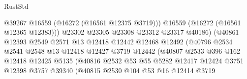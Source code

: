 \begin{lexlean}{RustStd}
\begin{coremodule}
                                          @39267
                                          @16559
                                          (@16272 (@16561 @12375 @3719)))
                                        @16559
                                        (@16272 (@16561 @12365 @12383)))
                                      @23302
                                      @23305
                                      @23308
                                      @23312
                                      @23317
                                      @40186)
                                    (@40861
                                      @12393
                                      @2549
                                      @2571
                                      @13
                                      @12418
                                      @12442
                                      @12468
                                      @12492
                                      (@40796
                                        @2534
                                        @2541
                                        @2548
                                        @13
                                        @12418
                                        @12427
                                        @3719
                                        @12442
                                        (@40807
                                          @2533
                                          @396
                                          @162
                                          @12418
                                          @12425
                                          @5135
                                          (@40816
                                            @2532
                                            @53
                                            @55
                                            @5282
                                            @12417
                                            @12424
                                            @3751
                                            @12398
                                            @3757
                                            @39340
                                            (@40815
                                              @2530
                                              @104
                                              @53
                                              @16
                                              @12414
                                              @3719

\end{coremodule}
\end{lexlean}
